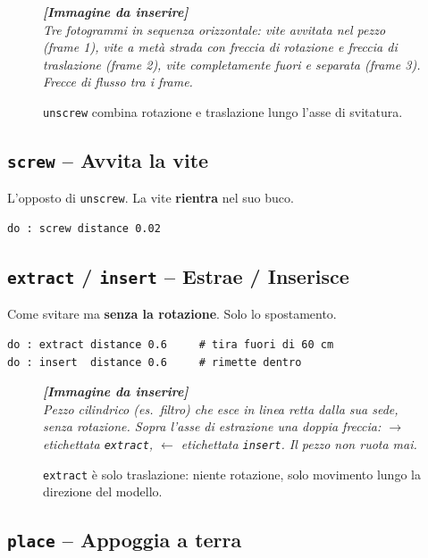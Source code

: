 ﻿\documentclass[a4paper,12pt,oneside]{book}
\newcommand{\val}[1]{\texttt{\color{cvtgreen}#1}}
\newcommand{\imgph}[2]{%
  \begin{tcolorbox}[colback=cvtlightblue!30,colframe=cvtblue!40,%
    width=#1,halign=center,valign=center,height=5cm,boxrule=0.5pt,arc=3pt]%
    \textcolor{cvtgray}{\itshape\footnotesize\textbf{[Immagine da inserire]}\\[3pt]#2}%
  \end{tcolorbox}}
\begin{document}
\begin{figure}[H]
  \centering
  \imgph{11cm}{Tre fotogrammi in sequenza orizzontale: vite avvitata nel pezzo (frame 1), vite a metà strada con freccia di rotazione e freccia di traslazione (frame 2), vite completamente fuori e separata (frame 3). Frecce di flusso tra i frame.}
  \caption{\val{unscrew} combina rotazione e traslazione lungo l'asse di svitatura.}
  \label{fig:unscrew-sequenza}
\end{figure}

\subsection{\texttt{screw} -- Avvita la vite}

L'opposto di \val{unscrew}. La vite \textbf{rientra} nel suo buco.

\begin{lstlisting}
do : screw distance 0.02
\end{lstlisting}

\subsection{\texttt{extract} / \texttt{insert} -- Estrae / Inserisce}

Come svitare ma \textbf{senza la rotazione}. Solo lo spostamento.

\begin{lstlisting}
do : extract distance 0.6     # tira fuori di 60 cm
do : insert  distance 0.6     # rimette dentro
\end{lstlisting}

\begin{figure}[H]
  \centering
  \imgph{10cm}{Pezzo cilindrico (es.\ filtro) che esce in linea retta dalla sua sede, senza rotazione. Sopra l'asse di estrazione una doppia freccia: $\rightarrow$ etichettata \texttt{extract}, $\leftarrow$ etichettata \texttt{insert}. Il pezzo non ruota mai.}
  \caption{\val{extract} è solo traslazione: niente rotazione, solo movimento lungo la direzione del modello.}
  \label{fig:extract-insert}
\end{figure}

\subsection{\texttt{place} -- Appoggia a terra}
\end{document}
